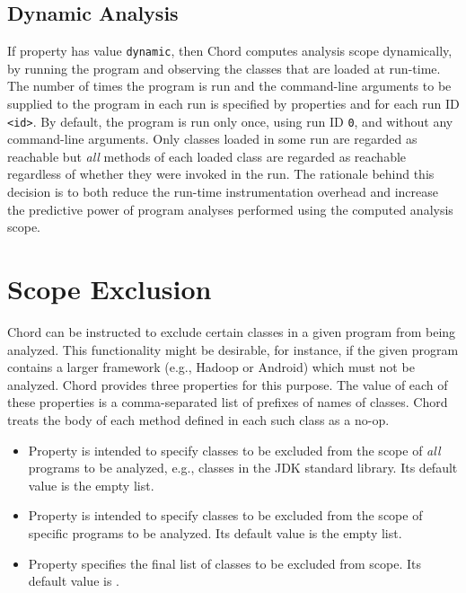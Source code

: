 \subsection{Dynamic Analysis}

If property  has value {\tt dynamic}, then Chord
computes analysis scope
dynamically, by running the program and observing the
classes that are loaded at run-time.  The number of times the program
is run and the command-line arguments to be supplied to the program in
each run is specified by properties  and
 for each run ID {\tt <id>}.  By default, the
program is run only once, using run ID {\tt 0}, and without any
command-line arguments.  Only classes loaded in some run are regarded
as reachable but {\it all} methods of each loaded class are regarded
as reachable regardless of whether they were invoked in the run.  The
rationale behind this decision is to both reduce the run-time instrumentation
overhead and increase the predictive power of program analyses
performed using the computed analysis scope.

\section{Scope Exclusion}
\label{sec:scope-exclude}

Chord can be instructed to exclude certain classes in a given program 
from being analyzed.
This functionality might be desirable, for instance, if the given program
contains a larger framework (e.g., Hadoop or Android) which
must not be analyzed.
Chord provides three properties for this purpose.
The value of each of these properties is a comma-separated list of prefixes
of names of classes.  Chord treats the body of each method defined in
each such class as a no-op.

\begin{itemize}
\item
Property  is intended to specify
classes to be excluded from the scope of {\it all} programs to be
analyzed, e.g., classes in the JDK standard library.  Its default
value is the empty list.
\item
Property  is intended to specify
classes to be excluded from the scope of specific programs to be
analyzed.  Its default value is the empty list.
\item
Property  specifies the final list of
classes to be excluded from scope.  Its default value is
.
\end{itemize}

